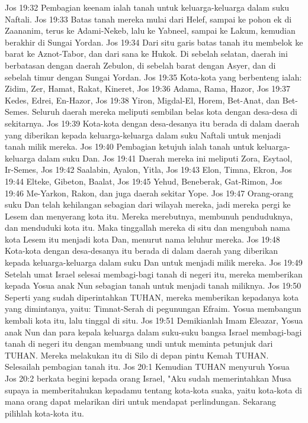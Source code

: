 Jos 19:32  Pembagian keenam ialah tanah untuk keluarga-keluarga dalam suku Naftali.
Jos 19:33  Batas tanah mereka mulai dari Helef, sampai ke pohon ek di Zaananim, terus ke Adami-Nekeb, lalu ke Yabneel, sampai ke Lakum, kemudian berakhir di Sungai Yordan.
Jos 19:34  Dari situ garis batas tanah itu membelok ke barat ke Aznot-Tabor, dan dari sana ke Hukok. Di sebelah selatan, daerah ini berbatasan dengan daerah Zebulon, di sebelah barat dengan Asyer, dan di sebelah timur dengan Sungai Yordan.
Jos 19:35  Kota-kota yang berbenteng ialah: Zidim, Zer, Hamat, Rakat, Kineret,
Jos 19:36  Adama, Rama, Hazor,
Jos 19:37  Kedes, Edrei, En-Hazor,
Jos 19:38  Yiron, Migdal-El, Horem, Bet-Anat, dan Bet-Semes. Seluruh daerah mereka meliputi sembilan belas kota dengan desa-desa di sekitarnya.
Jos 19:39  Kota-kota dengan desa-desanya itu berada di dalam daerah yang diberikan kepada keluarga-keluarga dalam suku Naftali untuk menjadi tanah milik mereka.
Jos 19:40  Pembagian ketujuh ialah tanah untuk keluarga-keluarga dalam suku Dan.
Jos 19:41  Daerah mereka ini meliputi Zora, Esytaol, Ir-Semes,
Jos 19:42  Saalabin, Ayalon, Yitla,
Jos 19:43  Elon, Timna, Ekron,
Jos 19:44  Elteke, Gibeton, Baalat,
Jos 19:45  Yehud, Beneberak, Gat-Rimon,
Jos 19:46  Me-Yarkon, Rakon, dan juga daerah sekitar Yope.
Jos 19:47  Orang-orang suku Dan telah kehilangan sebagian dari wilayah mereka, jadi mereka pergi ke Lesem dan menyerang kota itu. Mereka merebutnya, membunuh penduduknya, dan menduduki kota itu. Maka tinggallah mereka di situ dan mengubah nama kota Lesem itu menjadi kota Dan, menurut nama leluhur mereka.
Jos 19:48  Kota-kota dengan desa-desanya itu berada di dalam daerah yang diberikan kepada keluarga-keluarga dalam suku Dan untuk menjadi milik mereka.
Jos 19:49  Setelah umat Israel selesai membagi-bagi tanah di negeri itu, mereka memberikan kepada Yosua anak Nun sebagian tanah untuk menjadi tanah miliknya.
Jos 19:50  Seperti yang sudah diperintahkan TUHAN, mereka memberikan kepadanya kota yang dimintanya, yaitu: Timnat-Serah di pegunungan Efraim. Yosua membangun kembali kota itu, lalu tinggal di situ.
Jos 19:51  Demikianlah Imam Eleazar, Yosua anak Nun dan para kepala keluarga dalam suku-suku bangsa Israel membagi-bagi tanah di negeri itu dengan membuang undi untuk meminta petunjuk dari TUHAN. Mereka melakukan itu di Silo di depan pintu Kemah TUHAN. Selesailah pembagian tanah itu.
Jos 20:1  Kemudian TUHAN menyuruh Yosua
Jos 20:2  berkata begini kepada orang Israel, "Aku sudah memerintahkan Musa supaya ia memberitahukan kepadamu tentang kota-kota suaka, yaitu kota-kota di mana orang dapat melarikan diri untuk mendapat perlindungan. Sekarang pilihlah kota-kota itu.
